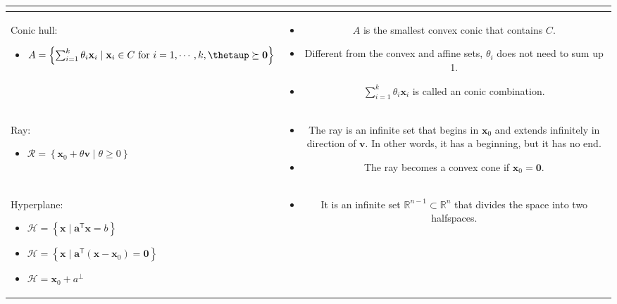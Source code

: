 \documentclass{article}
\newcommand{\trans}{\mathsf{T}}
\begin{document}
\begin{xltabular}{\textwidth}{|A|C|}
\begin{itemize}[leftmargin=*]
\end{itemize}\\
\hline
Conic hull:
\begin{itemize}[leftmargin=*]
    \item $A = \left\{ \sum_{i=1}^{k} \theta_i\mathbf{x}_i \mid \mathbf{x}_i \in C  \textnormal{ for } i=1,\cdots, k, \boldsymbol{\thetaup} \succeq \mathbf{0} \right\}$
\end{itemize} & \vspace{-3.5ex}
\begin{itemize}[leftmargin=*]
    \item $A$ is the smallest convex conic that contains $C$.
    \item Different from the convex and affine sets, \(\theta_i\) does not need to sum up 1.
    \item \(\sum_{i=1}^{k} \theta_i\mathbf{x}_i\) is called an conic combination.
\end{itemize}\\
\hline
Ray:
\begin{itemize}[leftmargin=*]
    \item \(\mathcal{R} = \left\{ \mathbf{x}_0 + \theta \mathbf{v} \mid \theta \geq 0 \right\}\)
\end{itemize} & \vspace{-3.5ex} \begin{itemize}[leftmargin=*]
    \item The ray is an infinite set that begins in \(\mathbf{x}_0\) and extends infinitely in direction of \(\mathbf{v}\). In other words, it has a beginning, but it has no end.
    \item The ray becomes a convex cone if \(\mathbf{x}_0 = \mathbf{0}.\)
\end{itemize} \\
\hline
Hyperplane:
\begin{itemize}[leftmargin=*]
    \item \( \mathcal{H} = \left\{ \mathbf{x} \mid \mathbf{a}^\trans \mathbf{x} = b \right\}\)
    \item \(\mathcal{H} = \left\{ \mathbf{x} \mid \mathbf{a}^\trans (\mathbf{x} - \mathbf{x}_{0}) = \mathbf{0} \right\}\)
    \item \(\mathcal{H} = \mathbf{x}_0 + a^{\perp} \)
\end{itemize} & \vspace{-3.5ex}
\begin{itemize}[leftmargin=*]
    \item It is an infinite set \(\mathbb{R}^{n-1} \subset \mathbb{R}^{n}\) that divides the space into two halfspaces.

\end{itemize}
\end{xltabular}
\end{document}
